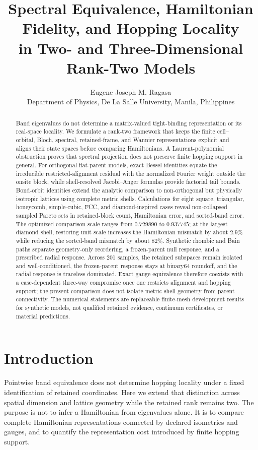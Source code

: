\documentclass[11pt]{article}
\title{\textbf{Spectral Equivalence, Hamiltonian Fidelity, and Hopping Locality\\
in Two- and Three-Dimensional Rank-Two Models}}
\author{Eugene Joseph M. Ragasa\\
Department of Physics, De La Salle University, Manila, Philippines}
\date{}
\begin{document}
\maketitle

\begin{abstract}
Band eigenvalues do not determine a matrix-valued tight-binding representation or its
real-space locality. We formulate a rank-two framework that keeps the finite
cell--orbital, Bloch, spectral, retained-frame, and Wannier representations explicit and
aligns their state spaces before comparing Hamiltonians. A Laurent-polynomial
obstruction proves that spectral projection does not preserve finite hopping support in
general. For orthogonal flat-parent models, exact Bessel identities equate the
irreducible restricted-alignment residual with the normalized Fourier weight outside the
onsite block, while shell-resolved Jacobi--Anger formulas provide factorial tail bounds.
Bond-orbit identities extend the analytic comparison to non-orthogonal but physically
isotropic lattices using complete metric shells. Calculations for eight square,
triangular, honeycomb, simple-cubic, FCC, and diamond-inspired cases reveal non-collapsed
sampled Pareto sets in retained-block count, Hamiltonian error, and sorted-band error.
The optimized comparison scale ranges from $0.729890$ to $0.937745$; at the largest
diamond shell, restoring unit scale increases the Hamiltonian mismatch by about $2.9\%$
while reducing the sorted-band mismatch by about $82\%$. Synthetic rhombic and Bain
paths separate geometry-only reordering, a frozen-parent null response, and a prescribed
radial response. Across 201 samples, the retained subspaces remain isolated and
well-conditioned, the frozen-parent response stays at binary64 roundoff, and the radial
response is traceless dominated. Exact gauge equivalence therefore coexists with a
case-dependent three-way compromise once one restricts alignment and hopping support;
the present comparison does not isolate metric-shell geometry from parent connectivity.
The numerical statements are replaceable finite-mesh development results for synthetic
models, not qualified retained evidence, continuum certificates, or material predictions.
\end{abstract}

\section{Introduction}

Pointwise band equivalence does not determine hopping locality under a fixed
identification of retained coordinates. Here we extend that distinction across spatial
dimension and lattice geometry while the retained rank remains two. The purpose is not
to infer a Hamiltonian from eigenvalues alone. It is to compare
complete Hamiltonian representations connected by declared isometries and gauges, and
to quantify the representation cost introduced by finite hopping support.
\end{document}
